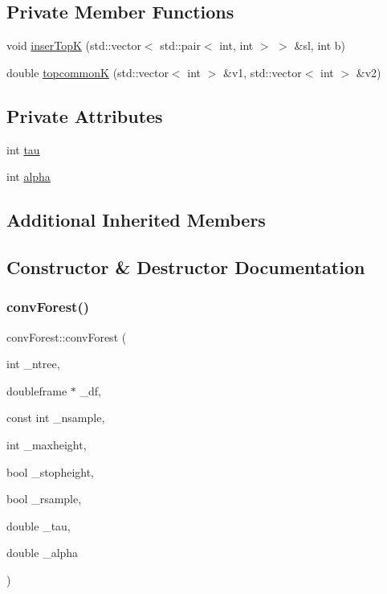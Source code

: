 \subsection*{Private Member Functions}
\begin{DoxyCompactItemize}
\item 
void \hyperlink{classconvForest_a64930c8a4d1e1f74fc45f3ce5c24a55e}{inser\+TopK} (std\+::vector$<$ std\+::pair$<$ int, int $>$ $>$ \&sl, int b)
\item 
double \hyperlink{classconvForest_a650511b77be61f6c5766fcd6b577b33e}{topcommonK} (std\+::vector$<$ int $>$ \&v1, std\+::vector$<$ int $>$ \&v2)
\end{DoxyCompactItemize}
\subsection*{Private Attributes}
\begin{DoxyCompactItemize}
\item 
int \hyperlink{classconvForest_a390216111823cd05c48aad3a358a49a7}{tau}
\item 
int \hyperlink{classconvForest_a69ed3ccc19fa0439f9fb64ce28c3c66f}{alpha}
\end{DoxyCompactItemize}
\subsection*{Additional Inherited Members}


\subsection{Constructor \& Destructor Documentation}
\mbox{\label{classconvForest_a03387416058b37c24de2d7a901275695}} 
\subsubsection{\texorpdfstring{conv\+Forest()}{convForest()}}
{\footnotesize\ttfamily conv\+Forest\+::conv\+Forest (\begin{DoxyParamCaption}\item[{int}]{\+\_\+ntree,  }\item[{doubleframe $\ast$}]{\+\_\+df,  }\item[{const int}]{\+\_\+nsample,  }\item[{int}]{\+\_\+maxheight,  }\item[{bool}]{\+\_\+stopheight,  }\item[{bool}]{\+\_\+rsample,  }\item[{double}]{\+\_\+tau,  }\item[{double}]{\+\_\+alpha }\end{DoxyParamCaption})\hspace{0.3cm}{\ttfamily [inline]}}

